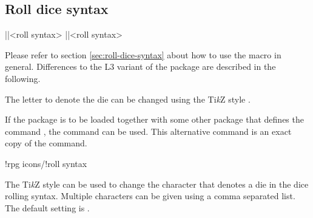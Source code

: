 \documentclass[a4paper]{article}
\begin{document}
\begin{codeexample}

\end{codeexample}

\subsection{Roll dice syntax}

\begin{macrodef}
|\roll|{<roll syntax>}
|\rpgiconsroll|{<roll syntax>}
\end{macrodef}
Please refer to section \ref{sec:roll-dice-syntax} about how to use the \macro{\roll} macro in general. Differences to the L3 variant of the package are described in the following.

The letter to denote the die can be changed using the Ti\emph{k}Z style .

If the  package is to be loaded together with some other package that defines the command \macro{\roll}, the command \macro{\rpgiconsroll} can be used. This alternative command is an exact copy of the \macro{\roll} command.

\begin{macrodef}
!rpg icons/!roll syntax
\end{macrodef}
The Ti\emph{k}Z style  can be used to change the character that denotes a die in the dice rolling syntax. Multiple characters can be given using a comma separated list. The default setting is .


\printchanges
\end{document}
